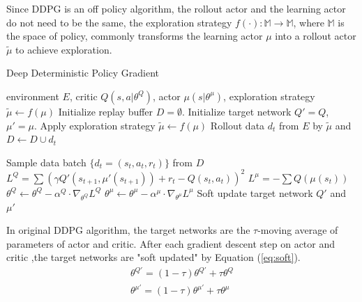 Since DDPG is an off policy algorithm, the rollout actor and the learning actor do not need to be the same, the exploration strategy $f(\cdot) : \mathbb{M} \rightarrow \mathbb{M}$, where $\mathbb{M}$ is the space of policy, commonly transforms the learning actor $\mu$ into a rollout actor $\tilde\mu$ to achieve exploration.

\begin{algorithm}[htbp]
   \caption{Deep Deterministic Policy Gradient}
   \label{alg:DDPG}
\begin{algorithmic}
    environment $E$, critic $Q(s,a|\theta^Q)$, actor $\mu(s|\theta^\mu)$, exploration strategy $\tilde\mu \leftarrow f(\mu)$
   \STATE Initialize replay buffer $D = \emptyset$.
   \STATE Initialize target network $Q'= Q$, $\mu'= \mu$.
   \STATE Apply exploration strategy $\tilde\mu \leftarrow f(\mu)$
   \STATE Rollout data $d_t$ from $E$ by $\tilde\mu$ and $D \leftarrow D\cup {d_t}$

   \STATE Sample data batch $\{d_t=(s_t,a_t,r_t)\}$ from $D$
   \STATE $L^Q=\sum(\gamma Q'(s_{t+1},\mu'(s_{t+1}))+r_t-Q(s_t,a_t))^2$
   \STATE $L^\mu=-\sum Q(\mu(s_t))$
   \STATE $\theta^Q \leftarrow \theta^Q - \alpha^Q\cdot\nabla_{\theta^Q} L^Q$
   \STATE $\theta^\mu \leftarrow \theta^\mu -\alpha^\mu\cdot\nabla_{\theta^\mu} L^\mu$
   \STATE Soft update target network $Q'$ and $\mu'$
   \ENDFOR
   \ENDFOR
\end{algorithmic}
\end{algorithm}

In original DDPG algorithm, the target networks are the $\tau$-moving average of parameters of actor and critic. After each gradient descent step on actor and critic ,the target networks are "soft updated" by Equation (\ref{eq:soft}).
\begin{equation}
\label{eq:soft} 
\begin{aligned}
\theta^{Q'} = (1-\tau)\theta^{Q'}+\tau\theta^Q\\
\theta^{\mu'} = (1-\tau)\theta^{\mu'}+\tau\theta^\mu
\end{aligned}
\end{equation}

